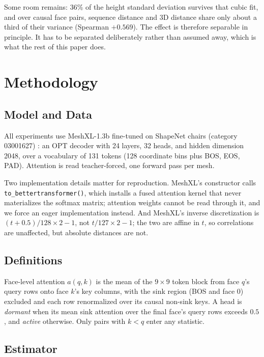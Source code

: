 \documentclass[conference]{IEEEtran}
\begin{document}
Some room remains: 36\% of the height standard deviation survives that cubic fit,
and over causal face pairs, sequence distance and 3D distance share only about a
third of their variance (Spearman $+0.569$). The effect is therefore separable in
principle. It has to be separated deliberately rather than assumed away, which is
what the rest of this paper does.

\section{Methodology}

\subsection{Model and Data}

All experiments use MeshXL-1.3b fine-tuned on ShapeNet chairs (category 03001627)
\cite{zhang2023shapenet}: an OPT decoder with 24 layers, 32 heads, and hidden
dimension 2048, over a vocabulary of 131 tokens (128 coordinate bins plus BOS,
EOS, PAD). Attention is read teacher-forced, one forward pass per mesh.

Two implementation details matter for reproduction. MeshXL's constructor calls
\texttt{to\_bettertransformer()}, which installs a fused attention kernel that
never materializes the softmax matrix; attention weights cannot be read through
it, and we force an eager implementation instead. And MeshXL's inverse
discretization is $(t + 0.5)/128 \times 2 - 1$, not $t/127 \times 2 - 1$; the two
are affine in $t$, so correlations are unaffected, but absolute distances are not.

\subsection{Definitions}

Face-level attention $a(q,k)$ is the mean of the $9\times 9$ token block from face
$q$'s query rows onto face $k$'s key columns, with the sink region (BOS and face
0) excluded and each row renormalized over its causal non-sink keys. A head is
\emph{dormant} when its mean sink attention over the final face's query rows
exceeds $0.5$, and \emph{active} otherwise. Only pairs with $k < q$ enter any
statistic.

\subsection{Estimator}
\end{document}
